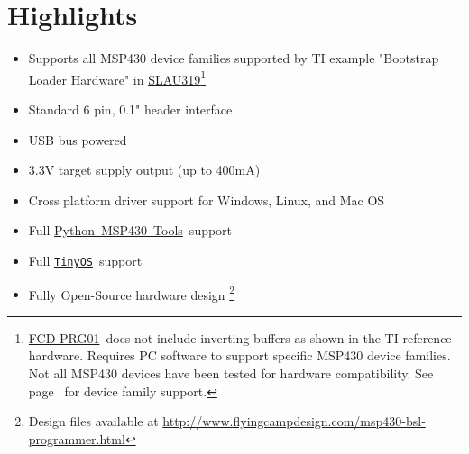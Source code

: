 \documentclass[10pt,letterpaper]{datasheet}
\newcommand{\mbp}{MSP430~BSL~Programmer}
\newcommand{\PIDNOLINK}{FCD\nobreakdash-PRG01}
\newcommand{\PID}{\href{http://www.flyingcampdesign.com/msp430-bsl-programmer.html}{\PIDNOLINK}}
\newcommand{\PIDURL}{\href{http://www.flyingcampdesign.com/msp430-bsl-programmer.html}{http://www.flyingcampdesign.com/msp430-bsl-programmer.html}}
\newcommand{\FCD}{FLYING~CAMP~DESIGN}
\newcommand{\tos}{\texttt{TinyOS}}
\newcommand{\tosurl}{\href{http://tinyos.net/}{\tos}}
\newcommand{\pmt}{Python~MSP430~Tools}
\newcommand{\pmturl}{\href{https://launchpad.net/python-msp430-tools/}{\pmt}}
\newcommand{\SLAUNOLINK}{SLAU319}
\newcommand{\SLAUPDF}{\href{http://www.ti.com/lit/pdf/SLAU319}{\SLAUNOLINK}}
\begin{document}
\title{\color{red}{\bf \mbp\newline\PIDNOLINK}}
\author{\FCD}
\date{}
\maketitle
\makefooter
\thispagestyle{fancy}

\section*{Highlights}
\begin{multicols}{2}
  \begin{itemize}
    \item Supports all MSP430 device families supported by TI example "Bootstrap Loader Hardware" in \SLAUPDF\footnote{\PID\ does not include inverting buffers as shown in the TI reference hardware.  Requires PC software to support specific MSP430 device families.  Not all MSP430 devices have been tested for hardware compatibility. See page~\pageref{tab:msp430-device-support} for device family support.}
    \item Standard 6 pin, 0.1" header interface
    \item USB bus powered
    \item 3.3V target supply output (up to 400mA)
    \item Cross platform driver support for Windows, Linux, and Mac OS
    \item Full \pmturl\ support
    \item Full \tosurl\ support
    \item Fully Open-Source hardware design%
    \footnote{Design files available at \PIDURL}
  \end{itemize}
\end{multicols}
\end{document}
